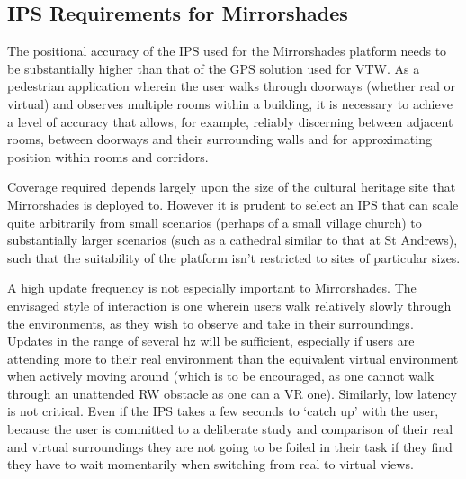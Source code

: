 
\subsection{IPS Requirements for Mirrorshades}
\label{ips-requirements-for-mirrorshades}
The positional accuracy of the IPS used for the Mirrorshades platform needs to be substantially higher than that of the GPS solution used for VTW. As a pedestrian application wherein the user walks through doorways (whether real or virtual) and observes multiple rooms within a building, it is necessary to achieve a level of accuracy that allows, for example, reliably discerning between adjacent rooms, between doorways and their surrounding walls and for approximating position within rooms and corridors.

Coverage required depends largely upon the size of the cultural heritage site that Mirrorshades is deployed to. However it is prudent to select an IPS that can scale quite arbitrarily from small scenarios (perhaps of a small village church) to substantially larger scenarios (such as a cathedral similar to that at St Andrews), such that the suitability of the platform isn't restricted to sites of particular sizes.

A high update frequency is not especially important to Mirrorshades. The envisaged style of interaction is one wherein users walk relatively slowly through the environments, as they wish to observe and take in their surroundings. Updates in the range of several hz will be sufficient, especially if users are attending more to their real environment than the equivalent virtual environment when actively moving around (which is to be encouraged, as one cannot walk through an unattended RW obstacle as one can a VR one). Similarly, low latency is not critical. Even if the IPS takes a few seconds to `catch up' with the user, because the user is committed to a deliberate study and comparison of their real and virtual surroundings they are not going to be foiled in their task if they find they have to wait momentarily when switching from real to virtual views.

